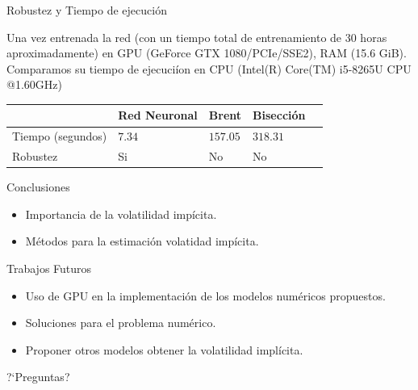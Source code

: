 \documentclass{beamer}
\begin{document}
\begin{frame}{Robustez y Tiempo de ejecuci\'on}
    
    Una vez entrenada la red (con un tiempo total de entrenamiento de 30 horas aproximadamente) en 
    GPU (GeForce GTX 1080/PCIe/SSE2), RAM (15.6 GiB). Comparamos su tiempo de ejecuci\'ion en 
    CPU (Intel(R) Core(TM) i5-8265U CPU @1.60GHz)

    \begin{table}[!htbp]
        \begin{center}
            \begin{tabular}{|l|l|l|l|l|}
                \hline
                 & Red Neuronal & Brent  &  Bisecci\'on  \\ \hline
                Tiempo (segundos)  & $7.34$  & $157.05$ & $318.31$   \\ \hline
                Robustez & Si  &  No & No \\ \hline
                  
            \end{tabular}
        \end{center}
    \end{table}

\end{frame}


\begin{frame}{Conclusiones}
  \begin{itemize}
    \item Importancia de la volatilidad imp\'icita.
    \item M\'etodos para la estimaci\'on volatidad imp\'icita.
  \end{itemize}
\end{frame}

\begin{frame}{Trabajos Futuros}

  \begin{itemize}
    \item Uso de GPU en la implementaci\'on de los modelos num\'ericos propuestos. 
    \item Soluciones para el problema num\'erico.
    \item Proponer otros modelos obtener la volatilidad impl\'icita.
  \end{itemize}

\end{frame}

\begin{frame}{?`Preguntas?}{}
\end{frame}
\end{document}

